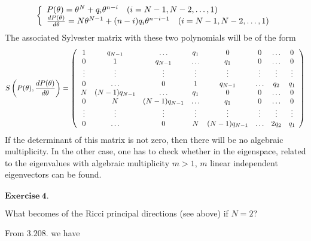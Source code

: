 \begin{align}
\left \{ \begin{array}{l}
 P(\theta) = \theta^{N} + q_i \theta^{n-i}  \quad (i= N-1,N-2,\dots, 1)\\
 \dv{P(\theta)}{\theta} = N \theta^{N-1} + (n-i)q_i \theta^{n-i-1}  \quad (i= N-1,N-2,\dots, 1)
\end{array} \right.
\end{align}
The associated Sylvester matrix with these two polynomials will be of the form $$ S \left( P(\theta),\dv{P(\theta)}{\theta}\right) = \left( \begin{array}{cccccccc}
 1&q_{N-1}&\dots&q_1&0&0&\dots&0\\
 0&1&q_{N-1}&\dots&q_1&0&\dots&0\\
 \vdots&\vdots&\vdots&\vdots&\vdots&\vdots&\vdots&\vdots\\
 0&\dots&0&1&q_{N-1}&\dots &q_2&q_1\\
 N&(N-1)q_{N-1}&\dots&q_1&0&0&\dots&0\\
 0&N&(N-1)q_{N-1}&\dots&q_1&0&\dots&0\\
 \vdots&\vdots&\vdots&\vdots&\vdots&\vdots&\vdots&\vdots\\
 0&\dots&0&N&(N-1)q_{N-1}&\dots &2q_2&q_1\\
\end{array} \right)
$$
If the determinant of this matrix is not zero, then there will be no algebraic multiplicity. In the other case, one has to check whether in the eigenspace, related to the eigenvalues with algebraic multiplicity $ m > 1$, $m$ linear independent eigenvectors can be found.\\\\ 
$\mathbf{Exercise \ 4.}$\\
\begin{tcolorbox}
What becomes of the Ricci principal directions (see above) if $N=2$?
\end{tcolorbox}
From $\mathbf{3.208.}$ we have
